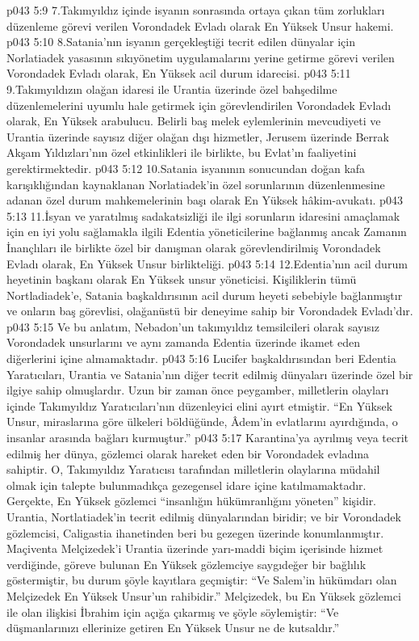 \vs p043 5:9 7.\bibnobreakspace Takımyıldız içinde isyanın sonrasında ortaya çıkan tüm zorlukları düzenleme görevi verilen Vorondadek Evladı olarak En Yüksek Unsur hakemi.
\vs p043 5:10 8.\bibnobreakspace Satania’nın isyanın gerçekleştiği tecrit edilen dünyalar için Norlatiadek yasasının sıkıyönetim uygulamalarını yerine getirme görevi verilen Vorondadek Evladı olarak, En Yüksek acil durum idarecisi.
\vs p043 5:11 9.\bibnobreakspace Takımyıldızın olağan idaresi ile Urantia üzerinde özel bahşedilme düzenlemelerini uyumlu hale getirmek için görevlendirilen Vorondadek Evladı olarak, En Yüksek arabulucu. Belirli baş melek eylemlerinin mevcudiyeti ve Urantia üzerinde sayısız diğer olağan dışı hizmetler, Jerusem üzerinde Berrak Akşam Yıldızları’nın özel etkinlikleri ile birlikte, bu Evlat’ın faaliyetini gerektirmektedir.
\vs p043 5:12 10.\bibnobreakspace Satania isyanının sonucundan doğan kafa karışıklığından kaynaklanan Norlatiadek’in özel sorunlarının düzenlenmesine adanan özel durum mahkemelerinin başı olarak En Yüksek hâkim\hyp{}avukatı.
\vs p043 5:13 11.\bibnobreakspace İsyan ve yaratılmış sadakatsizliği ile ilgi sorunların idaresini amaçlamak için en iyi yolu sağlamakla ilgili Edentia yöneticilerine bağlanmış ancak Zamanın İnançlıları ile birlikte özel bir danışman olarak görevlendirilmiş Vorondadek Evladı olarak, En Yüksek Unsur birlikteliği.
\vs p043 5:14 12.\bibnobreakspace Edentia’nın acil durum heyetinin başkanı olarak En Yüksek unsur yöneticisi. Kişiliklerin tümü Nortladiadek’e, Satania başkaldırısının acil durum heyeti sebebiyle bağlanmıştır ve onların baş görevlisi, olağanüstü bir deneyime sahip bir Vorondadek Evladı’dır.
\vs p043 5:15 Ve bu anlatım, Nebadon’un takımyıldız temsilcileri olarak sayısız Vorondadek unsurlarını ve aynı zamanda Edentia üzerinde ikamet eden diğerlerini içine almamaktadır.
\vs p043 5:16 Lucifer başkaldırısından beri Edentia Yaratıcıları, Urantia ve Satania’nın diğer tecrit edilmiş dünyaları üzerinde özel bir ilgiye sahip olmuşlardır. Uzun bir zaman önce peygamber, milletlerin olayları içinde Takımyıldız Yaratıcıları’nın düzenleyici elini ayırt etmiştir. “En Yüksek Unsur, miraslarına göre ülkeleri böldüğünde, Âdem’in evlatlarını ayırdığında, o insanlar arasında bağları kurmuştur.”
\vs p043 5:17 Karantina’ya ayrılmış veya tecrit edilmiş her dünya, gözlemci olarak hareket eden bir Vorondadek evladına sahiptir. O, Takımyıldız Yaratıcısı tarafından milletlerin olaylarına müdahil olmak için talepte bulunmadıkça gezegensel idare içine katılmamaktadır. Gerçekte, En Yüksek gözlemci “insanlığın hükümranlığını yöneten” kişidir. Urantia, Nortlatiadek’in tecrit edilmiş dünyalarından biridir; ve bir Vorondadek gözlemcisi, Caligastia ihanetinden beri bu gezegen üzerinde konumlanmıştır. Maçiventa Melçizedek’i Urantia üzerinde yarı\hyp{}maddi biçim içerisinde hizmet verdiğinde, göreve bulunan En Yüksek gözlemciye saygıdeğer bir bağlılık göstermiştir, bu durum şöyle kayıtlara geçmiştir: “Ve Salem’in hükümdarı olan Melçizedek En Yüksek Unsur’un rahibidir.” Melçizedek, bu En Yüksek gözlemci ile olan ilişkisi İbrahim için açığa çıkarmış ve şöyle söylemiştir: “Ve düşmanlarınızı ellerinize getiren En Yüksek Unsur ne de kutsaldır.”
